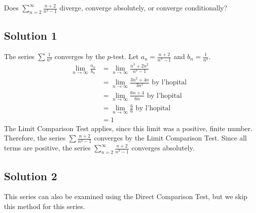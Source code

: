 \documentclass{article}
\begin{document}
\noindent
Does $\displaystyle \sum_{n=2}^\infty \frac{n+2}{n^3-1}$
diverge, converge absolutely, or converge conditionally?

\subsection*{Solution 1}

The series $\sum \frac1{n^2}$ converges by the $p$-test. Let $a_n = \frac{n+2}{n^3-1}$ and $b_n = \frac1{n^2}$.
\begin{align*}
\lim_{n \to \infty} \frac{a_n}{b_n}
&= \lim_{n \to \infty} \frac{n^3+2n^2}{n^3-1}\\
&= \lim_{n \to \infty} \frac{3n^2+4n}{3n^2} \text{ by l'hopital}\\
&= \lim_{n \to \infty} \frac{6n+4}{6n} \text{ by l'hopital}\\
&= \lim_{n \to \infty} \frac66 \text{ by l'hopital}\\
&= 1
\end{align*}
The Limit Comparison Test applies, since this limit was a positive, finite number. Therefore, the series $\sum \frac{n+2}{n^3-1}$ converges by the Limit Comparison Test.
 Since all terms are positive, the series $\displaystyle \sum_{n=2}^\infty \frac{n+2}{n^3-1}$ converges absolutely.

\subsection*{Solution 2}

This series can also be examined using the Direct Comparison Test, but we skip this method for this series.
\end{document}
